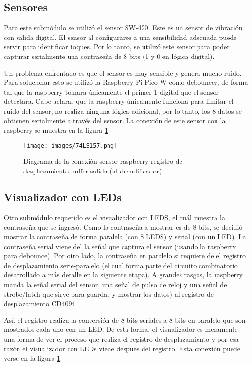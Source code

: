 \documentclass[conference]{IEEEtran}  %
\begin{document}
\subsection{Sensores}

Para este submódulo se utilizó el sensor SW-420. Este es un sensor de vibración con salida digital. El sensor al configurarse a una sensibilidad adecuada puede servir para identificar toques. Por lo tanto, se utilizó este sensor para poder capturar serialmente una contraseña de 8 bits (1 y 0 en lógica digital).

Un problema enfrentado es que el sensor es muy sensible y genera mucho ruido. Para solucionar esto se utilizó la Raspberry Pi Pico W como debouncer, de forma tal que la raspberry tomara únicamente el primer 1 digital que el sensor detectara. Cabe aclarar que la raspberry únicamente funciona para limitar el ruido del sensor, no realiza ninguna lógica adicional, por lo tanto, los 8 datos se obtienen serialmente a través del sensor. La conexión de este sensor con la raspberry se muestra en la figura \ref{fig:diagrama1}

\begin{figure}[h]
    \centering
    \texttt{[image: images/74LS157.png]}
    \caption{Diagrama de la conexión sensor-raspberry-registro de desplazamiento-buffer-salida (al decodificador).}
    \label{fig:diagrama1}
\end{figure}

\subsection{Visualizador con LEDs}

Otro submódulo requerido es el visualizador con LEDS, el cuál muestra la contraseña que se ingresó. Como la contraseña a mostrar es de 8 bits, se decidió mostrar la contraseña de forma paralela (con 8 LEDS) y serial (con un LED). La contraseña serial viene del la señal que captura el sensor (usando la raspberry para debounce). Por otro lado, la contraseña en paralelo si requiere de el registro de desplazamiento serie-paralelo (el cual forma parte del circuito combinatorio desarrollado a más detalle en la siguiente etapa). A grandes rasgos, la raspberry manda la señal serial del sensor, una señal de pulso de reloj y una señal de strobe/latch que sirve para guardar y mostrar los datos) al registro de desplazamiento CD4094. 

Así, el registro realiza la conversión de 8 bits seriales a 8 bits en paralelo que son mostrados cada uno con un LED. De esta forma, el visualizador es meramente una forma de ver el proceso que realiza el registro de desplazamiento y por esa razón el visualizador con LEDs viene después del registro. Esta conexión puede verse en la figura \ref{fig:diagrama1}
\end{document}

